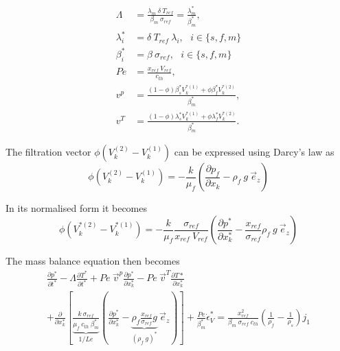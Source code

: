 \documentclass[]{scrreprt}
\begin{document}
\begin{subequations}
  \label{eq:def_parameters}
  \begin{align}
  \Lambda &= \frac{\lambda_m \: \delta \: T_{ref}}{\beta_m\:\sigma_{ref}}=\frac{\lambda^*_m}{\beta^*_m}, \\   
  \lambda^*_i &= \delta \: T_{ref} \:\lambda_i, \:\:\: i\in\{s,f,m\}\\
  \beta^*_i &= \beta \: \sigma_{ref}, \:\:\: i\in\{s,f,m\}\\
  Pe &= \frac{x_{ref}\:V_{ref}}{c_{th}}, \\   
  v^p &= \frac{(1-\phi)\beta^*_s V^{*(1)}_k + \phi\beta^*_f V^{*(2)}_k}{\beta^*_m}, \\   
  v^T &= \frac{(1-\phi)\lambda^*_s V^{*(1)}_k + \phi\lambda^*_f V^{*(2)}_k}{\beta^*_m}.
  \end{align}
\end{subequations}

The filtration vector $\phi(V^{(2)}_k -V^{(1)}_k)$ can be expressed using Darcy's law as
\begin{equation}
  \label{eq:darcy}
  \phi(V^{(2)}_k -V^{(1)}_k) = -\frac{k}{\mu_f} \left(\frac{\partial p_f}{\partial x_k} - \rho_f\:g\:\vec{e}_z \right)
\end{equation}

In its normalised form it becomes 
\begin{equation}
  \label{eq:darcy_normalised}
  \phi(V^{*(2)}_k -V^{*(1)}_k)
  = -\frac{k}{\mu_f} \frac{\sigma_{ref}}{x_{ref}\:V_{ref}}\left(\frac{\partial p^*}{\partial x^*_k} - \frac{x_{ref}}{\sigma_{ref}}\rho_f\:g\:\vec{e}_z \right)
\end{equation}

The mass balance equation then becomes
\begin{multline}
  \label{eq:mixture_mass_balance6}
  \frac{\partial p^*}{\partial t^*} 
  - \Lambda \frac{\partial T^*}{\partial t^*} 
  + Pe \:\vec{v}^p \frac{\partial p^*}{\partial x^*_k} 
  - Pe \:\vec{v}^T \frac{\partial T*}{\partial x^*_k} \\
  + \frac{\partial}{\partial x^*_k} \left[ \underbrace{\frac{k \: \sigma_{ref}}{\mu_f\:c_{th}\:\beta^*_m}}_{1/Le} \left( \frac{\partial p^*}{\partial x^*_k} - \underbrace{\rho_f \frac{x_{ref}}{\sigma_{ref}}g}_{(\rho_f\:g)^*}\: \vec{e}_z  \right) \right]
  + \frac{Pe}{\beta^*_m} \dot{\epsilon}^*_V  
  = \frac{x^2_{ref}}{\beta_m\:\sigma_{ref}\:c_{th}} \left(\frac{1}{\rho_f} - \frac{1}{\rho_s}\right)j_1
\end{multline}
\end{document}

